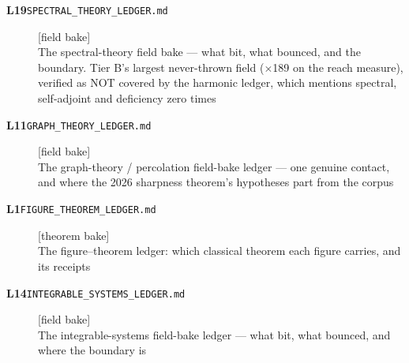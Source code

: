 \begin{description}
\item[\textbf{L19}\quad\texttt{SPECTRAL\_THEORY\_LEDGER.md}]\hfill\textsf{[field bake]}\\
The spectral-theory field bake --- what bit, what bounced, and the boundary. Tier B's largest never-thrown field ($\times$189 on the reach measure), verified as NOT covered by the harmonic ledger, which mentions spectral, self-adjoint and deficiency zero times
\item[\textbf{L11}\quad\texttt{GRAPH\_THEORY\_LEDGER.md}]\hfill\textsf{[field bake]}\\
The graph-theory / percolation field-bake ledger --- one genuine contact, and where the 2026 sharpness theorem's hypotheses part from the corpus
\item[\textbf{L1}\quad\texttt{FIGURE\_THEOREM\_LEDGER.md}]\hfill\textsf{[theorem bake]}\\
The figure--theorem ledger: which classical theorem each figure carries, and its receipts
\item[\textbf{L14}\quad\texttt{INTEGRABLE\_SYSTEMS\_LEDGER.md}]\hfill\textsf{[field bake]}\\
The integrable-systems field-bake ledger --- what bit, what bounced, and where the boundary is
\end{description}
\endgroup
